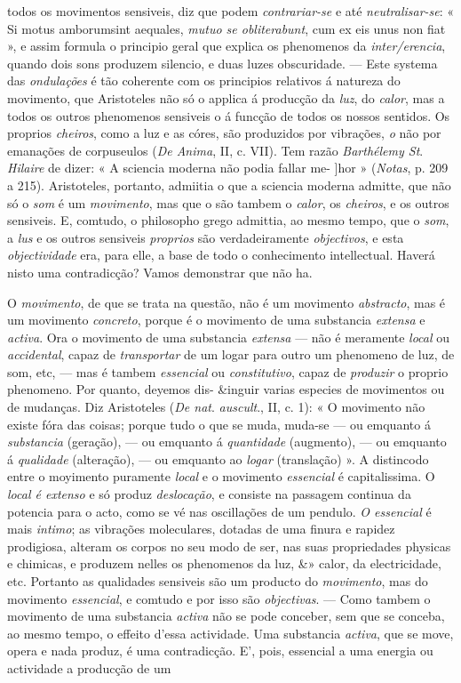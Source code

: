 todos os movimentos sensiveis, diz que podem \emph{contrariar-se} e até \emph{neutralisar-se}: « Si motus amborumsint aequales, \emph{mutuo se obliterabunt}, cum ex eis unus non fiat », e assim formula o principio geral que explica os phenomenos da \emph{inter/erencia}, quando dois sons produzem silencio, e duas luzes obscuridade. --- Este systema das \emph{ondulações} é tão coherente com os principios relativos á natureza do movimento, que Aristoteles não só o applica á producção da \emph{luz}, do \emph{calor}, mas a todos os outros phenomenos sensiveis o á funcção de todos os nossos sentidos. Os proprios \emph{cheiros}, como a luz e as córes, são produzidos por vibrações, \emph{o} não por emanações de corpuseulos (\emph{De Anima}, II, c. VII). Tem razão \emph{Barthélemy St}. \emph{Hilaire} de dizer: « A sciencia moderna não podia fallar me- ]hor » (\emph{Notas}, p. 209 a 215). Aristoteles, portanto, admiitia o que a sciencia moderna admitte, que não só o \emph{som} é um \emph{movimento}, mas que o são tambem o \emph{calor}, os \emph{cheiros}, e os outros sensiveis. E, comtudo, o philosopho grego admittia, ao mesmo tempo, que o \emph{som}, a \emph{lus} e os outros sensiveis \emph{proprios} são verdadeiramente \emph{objectivos}, e esta \emph{objectividade} era, para elle, a base de todo o conhecimento intellectual. Haverá nisto uma contradicção? Vamos demonstrar que não ha.\par O \emph{movimento}, de que se trata na questão, não é um movimento \emph{abstracto}, mas é um movimento \emph{concreto}, porque é o movimento de uma substancia \emph{extensa} e \emph{activa}. Ora o movimento de uma substancia \emph{extensa} --- não é meramente \emph{local} ou \emph{accidental}, capaz de \emph{transportar} de um logar para outro um phenomeno de luz, de som, etc, --- mas é tambem \emph{essencial} ou \emph{constitutivo}, capaz de \emph{produzir} o proprio phenomeno. Por quanto, deyemos dis- \&inguir varias especies de movimentos ou de mudanças. Diz Aristoteles (\emph{De nat}. \emph{auscult}., II, c. 1): « O movimento não existe fóra das coisas; porque tudo o que se muda, muda-se --- ou emquanto á \emph{substancia} (geração), --- ou emquanto á \emph{quantidade} (augmento), --- ou emquanto á \emph{qualidade} (alteração), --- ou emquanto ao \emph{logar} (translação) ». A distincodo entre o moyimento puramente \emph{local} e o movimento \emph{essencial} é capitalissima. O \emph{local é extenso} e só produz \emph{deslocação}, e consiste na passagem continua da potencia para o acto, como se vé nas oscillações de um pendulo. \emph{O essencial} é mais \emph{intimo}; as vibrações moleculares, dotadas de uma finura e rapidez prodigiosa, alteram os corpos no seu modo de ser, nas suas propriedades physicas e chimicas, e produzem nelles os phenomenos da luz, \&» calor, da electricidade, etc. Portanto as qualidades sensiveis são um producto do \emph{movimento}, mas do movimento \emph{essencial}, e comtudo e por isso são \emph{objectivas}. --- Como tambem o movimento de uma substancia \emph{activa} não se pode conceber, sem que se conceba, ao mesmo tempo, o effeito d'essa actividade. Uma substancia \emph{activa}, que se move, opera e nada produz, é uma contradicção. E', pois, essencial a uma energia ou actividade a producção de um 
